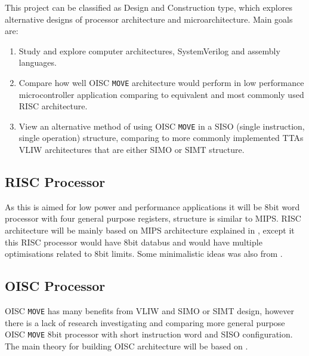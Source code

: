 \iffalse
This chapter describes your Goals and Objectives. 
Indicate how your work is intended to expand on previous historical work.
Present your motivations; why are you doing this?
Indicate the type of project you have(see the list above).

Types of Projects:
2) Design and Construction projects:
These types of projects involve the design and construction of some 
electrical or electronic apparatus or device within the bounds 
of the department's educational mandate.
\fi


This project can be classified as Design and Construction type, which explores alternative designs of processor architecture and microarchitecture. Main goals are:
\begin{enumerate}
	\item Study and explore computer architectures, SystemVerilog and assembly languages. 
	\item Compare how well OISC \texttt{MOVE} architecture would perform in low performance microcontroller application comparing to equivalent and most commonly used RISC architecture.
	\item View an alternative method of using OISC \texttt{MOVE} in a SISO (single instruction, single operation) structure, comparing to more commonly implemented TTAs VLIW architectures that are either SIMO or SIMT structure.
\end{enumerate}



\subsection{RISC Processor}
As this is aimed for low power and performance applications it will be 8bit word processor with four general purpose registers, structure is similar to MIPS.
RISC architecture will be mainly based on MIPS architecture explained in \autocite{harris_harris_2013}, except it this RISC processor would have 8bit databus and would have multiple optimisations related to 8bit limits. Some minimalistic ideas was also from \autocite{gilreath_laplante_2003}.


\subsection{OISC Processor}
OISC \texttt{MOVE} has many benefits from VLIW and SIMO or SIMT design, however there is a lack of research investigating and comparing more general purpose OISC \texttt{MOVE} 8bit processor with short instruction word and SISO configuration.  The main theory for building OISC architecture will be based on \autocite{gilreath_laplante_2003}.

